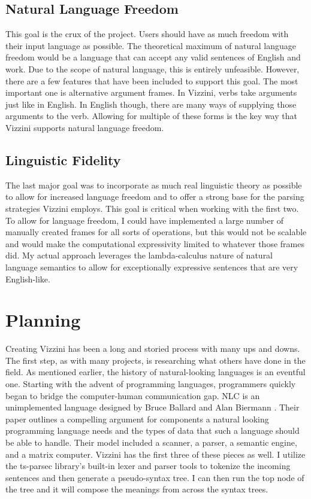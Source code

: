 \documentclass[titlepage]{article}
\newcommand{\langName}{Vizzini}
\begin{document}
\subsection*{Natural Language Freedom}
This goal is the crux of the project. Users should have as much freedom with their input language as possible. The theoretical maximum of natural language freedom would be a language that can accept any valid sentences of English and work. Due to the scope of natural language, this is entirely unfeasible. However, there are a few features that have been included to support this goal. The most important one is alternative argument frames. In \langName{}, verbs take arguments just like in English. In English though, there are many ways of supplying those arguments to the verb. Allowing for multiple of these forms is the key way that \langName{} supports natural language freedom.

\subsection*{Linguistic Fidelity}
The last major goal was to incorporate as much real linguistic theory as possible to allow for increased language freedom and to offer a strong base for the parsing strategies \langName{} employs. This goal is critical when working with the first two. To allow for language freedom, I could have implemented a large number of manually created frames for all sorts of operations, but this would not be scalable and would make the computational expressivity limited to whatever those frames did. My actual approach leverages the lambda-calculus nature of natural language semantics to allow for exceptionally expressive sentences that are very English-like.

\section*{Planning}
Creating \langName{} has been a long and storied process with many ups and downs. The first step, as with many projects, is researching what others have done in the field. As mentioned earlier, the history of natural-looking languages is an eventful one. Starting with the advent of programming languages, programmers quickly began to bridge the computer-human communication gap. NLC is an unimplemented language designed by Bruce Ballard and Alan Biermann \cite{Ballard1979ProgrammingIN}. Their paper outlines a compelling argument for components a natural looking programming language needs and the types of data that such a language should be able to handle. Their model included a scanner, a parser, a semantic engine, and a matrix computer. \langName{} has the first three of these pieces as well. I utilize the ts-parsec library's built-in lexer and parser tools to tokenize the incoming sentences and then generate a pseudo-syntax tree. I can then run the top node of the tree and it will compose the meanings from across the syntax trees.
\end{document}
